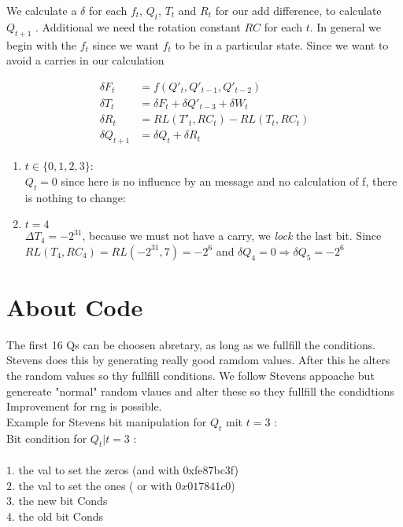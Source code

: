 We calculate a $\delta$ for each $f_t$, $Q_t$, $T_t$ and $R_t$ for our add difference, to calculate $Q_{t+1}$ .
Additional we need the rotation constant $RC$ for each $t$. 
In general we begin with the $f_t$ since we want $f_t$ to be in a particular state.
Since we want to avoid a carries in our calculation 


\begin{align*}
    \delta F_t &= f \left( Q'_t,Q'_{t-1},Q'_{t-2} \right) \\
    \delta T_t &= \delta F_t + \delta  Q'_{t-3} + \delta W_t \\
    \delta R_t &=  RL \left(T'_t,RC_t \right) - RL \left(T_t,RC_t \right)\\
    \delta Q_{t+1} &= \delta Q_t + \delta R_t
\end{align*}


\begin{enumerate}
    \item $t \in \{0,1,2,3\}$:\\
     $Q_t = 0 $ since here is no influence by an message and no calculation of f, there is nothing to change:
    \item $t = 4$\\
    $\Delta T_4 = -2^{31}$, because we must not have a carry, we \textit{lock} the last bit.
    Since  $RL(T_4, RC_4) = RL(-2^{31}, 7) = -2^6 $ and $\delta Q_4 = 0 \Rightarrow  \delta Q_5 = -2^6$  
\end{enumerate}

\section{About Code}
The first 16 Qs can be choosen abretary, as long as we fullfill the conditions.\\
Stevens does this by generating really good ramdom values.
After this he alters the random values so thy fullfill conditions.
We follow Stevens appoache but genereate "normal" random vlaues and alter these so they fullfill the condidtions
Improvement for rng is possible. \\
Example for Stevens bit manipulation for $Q_t$ mit $t = 3$ :\\
Bit condition for $Q_t | t =3$ :\\
\\
$1.$ the val to set the zeros (and with 0xfe87bc3f)\\
$2.$ the val to set the ones ( or with $0x017841c0$)\\
$3.$ the new bit Conds\\
$4.$ the old bit Conds



